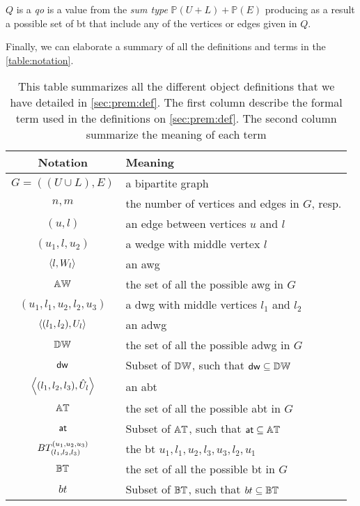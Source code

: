 \begin{definition}[\acrfull{qo}]\label{def:query:match} 
$Q$ is a \emph{\acrfull{qo}} is a value from the  \textit{sum type}
$\mathbb{P}(U + L) + \mathbb{P}(E)$ producing as a result a possible set of \acrshort{bt} that include any of the vertices or edges given in $Q$.
\end{definition}

Finally, we can elaborate a summary of all the definitions and terms in the \autoref{table:notation}.

\begin{table}[!ht]
\centering
\begin{tabular}{|c|l|} \hline
\textbf{Notation} & \textbf{Meaning}\\ \hline
$G=((U\cup L),E)$ & a bipartite graph\\  \hline
$n,m$ & the number of vertices and edges in $G$, resp.\\  \hline
$(u,l)$ & an edge between vertices $u$ and $l$\\  \hline
$(u_1,l,u_2)$ & a wedge with  middle vertex $l$\\  \hline
$\left\langle l, W_l \right\rangle$ & an \acrshort{awg}\\  \hline
$\mathbb{AW}$ & the set of all the possible \acrshort{awg} in $G$\\  \hline
$(u_1,l_1,u_2,l_2,u_3)$ & a \acrshort{dwg} with middle vertices $l_1$ and $l_2$\\  \hline 
$\left\langle (l_1, l_2), U_l \right\rangle$ & an \acrshort{adwg}\\  \hline
$\mathbb{DW}$ & the set of all the possible \acrshort{adwg} in $G$\\  \hline
$\mathsf{dw}$ & Subset of $\mathbb{DW}$, such that $\mathsf{dw} \subseteq \mathbb{DW}$ \\  \hline
$\left\langle (l_1, l_2,l_3), \hat{U}_l \right\rangle$ & an \acrshort{abt}\\  \hline
$\mathbb{AT}$ & the set of all the possible \acrshort{abt} in $G$ \\  \hline
$\mathsf{at}$ & Subset of $\mathbb{AT}$, such that $\mathsf{at} \subseteq \mathbb{AT}$ \\  \hline 
$BT_{(l_1, l_2,l_3)}^{(u_1, u_2, u_3)}$ & the \acrshort{bt} $u_1,l_1,u_2,l_3,u_3,l_2,u_1$\\  \hline
$\mathbb{BT}$ & the set of all the possible \acrshort{bt} in $G$ \\  \hline
$bt$ & Subset of $\mathbb{BT}$, such that $bt \subseteq \mathbb{BT}$ \\  \hline
\end{tabular}
\caption[{[\acrshort{iebt}] Summary of notations and their meanings}]{This table summarizes all the different object definitions that we have detailed in \autoref{sec:prem:def}. The first column describe the formal term used in the definitions on \autoref{sec:prem:def}. The second column summarize the meaning of each term}
\label{table:notation}
\end{table}
      
